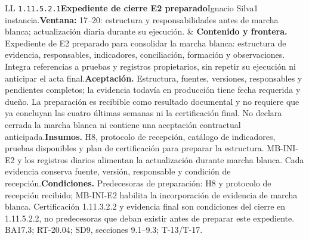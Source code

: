 \begin{longtable}{L{\tabcolsep\relax}L{\tabcolsep\relax}}
\texttt{1.\allowbreak{}11.\allowbreak{}5.\allowbreak{}2.\allowbreak{}1}\newline{}\textbf{Expediente de cierre E2 preparado}\newline{}Ignacio Silva\newline{}1 instancia.\newline{}\textbf{Ventana:} 17--20: estructura y responsabilidades antes de marcha blanca; actualización diaria durante su ejecución. & \textbf{Contenido y frontera.} Expediente de E2 preparado para consolidar la marcha blanca: estructura de evidencia, responsables, indicadores, conciliación, formación y observaciones. Integra referencias a pruebas y registros propietarios, sin repetir su ejecución ni anticipar el acta final.\newline{}\textbf{Aceptación.} Estructura, fuentes, versiones, responsables y pendientes completos; la evidencia todavía en producción tiene fecha requerida y dueño. La preparación es recibible como resultado documental y no requiere que ya concluyan las cuatro últimas semanas ni la certificación final. No declara cerrada la marcha blanca ni contiene una aceptación contractual anticipada.\newline{}\textbf{Insumos.} H8, protocolo de recepción, catálogo de indicadores, pruebas disponibles y plan de certificación para preparar la estructura. MB-INI-E2 y los registros diarios alimentan la actualización durante marcha blanca. Cada evidencia conserva fuente, versión, responsable y condición de recepción.\newline{}\textbf{Condiciones.} Predecesoras de preparación: H8 y protocolo de recepción recibido; MB-INI-E2 habilita la incorporación de evidencia de marcha blanca. Certificación 1.11.3.2.2 y evidencia final son condiciones del cierre en 1.11.5.2.2, no predecesoras que deban existir antes de preparar este expediente. BA17.3; RT-20.04; SD9, secciones 9.1--9.3; T-13/T-17.\\\hline

\end{longtable}
